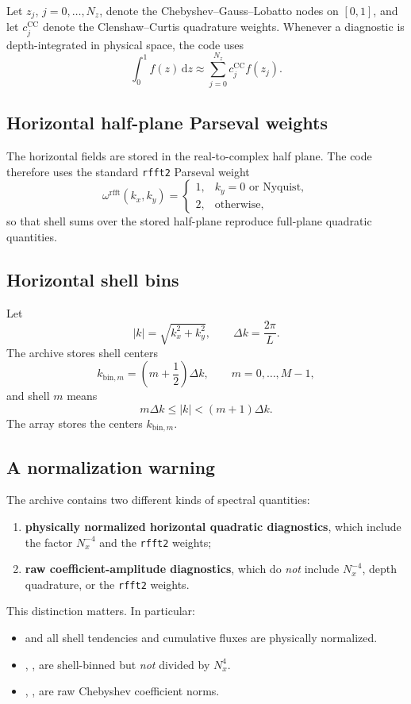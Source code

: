 \documentclass[11pt]{article}
\newcommand{\dd}{\mathrm{d}}
\newcommand{\kbm}{k_{\mathrm{bin},m}}
\newcommand{\cc}{c^{\mathrm{CC}}}
\newcommand{\rr}{\omega^{\mathrm{rfft}}}
\begin{document}
Let \(z_j\), \(j=0,\dots,N_z\), denote the Chebyshev--Gauss--Lobatto nodes on
\([0,1]\), and let \(\cc_j\) denote the Clenshaw--Curtis quadrature weights.
Whenever a diagnostic is depth-integrated in physical space, the code uses
\[
\int_0^1 f(z)\,\dd z
\approx
\sum_{j=0}^{N_z} \cc_j f(z_j).
\]

\subsection{Horizontal half-plane Parseval weights}

The horizontal fields are stored in the real-to-complex half plane. The code
therefore uses the standard \texttt{rfft2} Parseval weight
\[
\rr(k_x,k_y)
=
\begin{cases}
1, & k_y = 0 \text{ or Nyquist},\\
2, & \text{otherwise},
\end{cases}
\]
so that shell sums over the stored half-plane reproduce full-plane quadratic
quantities.

\subsection{Horizontal shell bins}

Let
\[
|k| = \sqrt{k_x^2 + k_y^2},
\qquad
\Delta k = \frac{2\pi}{L}.
\]
The archive stores shell centers
\[
\kbm = \left(m + \frac12\right)\Delta k,
\qquad
m=0,\dots,M-1,
\]
and shell \(m\) means
\[
m\Delta k \le |k| < (m+1)\Delta k.
\]
The array  stores the centers \(\kbm\).

\subsection{A normalization warning}

The archive contains two different kinds of spectral quantities:
\begin{enumerate}
\item \textbf{physically normalized horizontal quadratic diagnostics},
  which include the factor \(N_x^{-4}\) and the \texttt{rfft2} weights;
\item \textbf{raw coefficient-amplitude diagnostics},
  which do \emph{not} include \(N_x^{-4}\), depth quadrature, or the
  \texttt{rfft2} weights.
\end{enumerate}

This distinction matters. In particular:
\begin{itemize}
\item {} and all shell tendencies and cumulative fluxes are
  physically normalized.
\item {}, ,  are
  shell-binned but \emph{not} divided by \(N_x^4\).
\item {}, ,  are raw
  Chebyshev coefficient norms.
\end{itemize}
\end{document}

